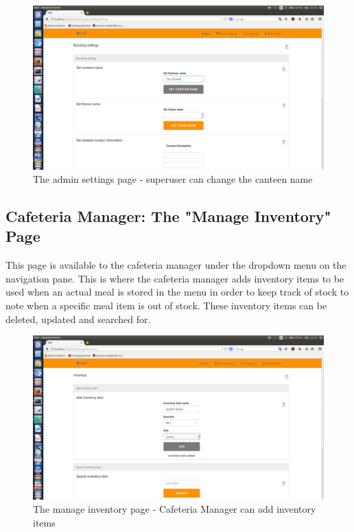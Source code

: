 \documentclass[a4paper,12pt]{article}
\begin{document}
\begin{figure}[H]
  \centering
    \includegraphics[width=1.0\textwidth]{screenshots/canteenName.png}
    \caption{The admin settings page - superuser can change the canteen name}
\end{figure}

\subsection{Cafeteria Manager: The "Manage Inventory" Page}
This page is available to the cafeteria manager under the dropdown menu on the navigation pane. This is where the cafeteria manager adds inventory items to be used when an actual meal is stored in the menu in order to keep track of stock to note when a specific meal item is out of stock. These inventory items can be deleted, updated and searched for.

\begin{figure}[H]
  \centering
    \includegraphics[width=1.0\textwidth]{screenshots/addInv.png}
    \caption{The manage inventory page - Cafeteria Manager can add inventory items}
\end{figure}
\end{document}
